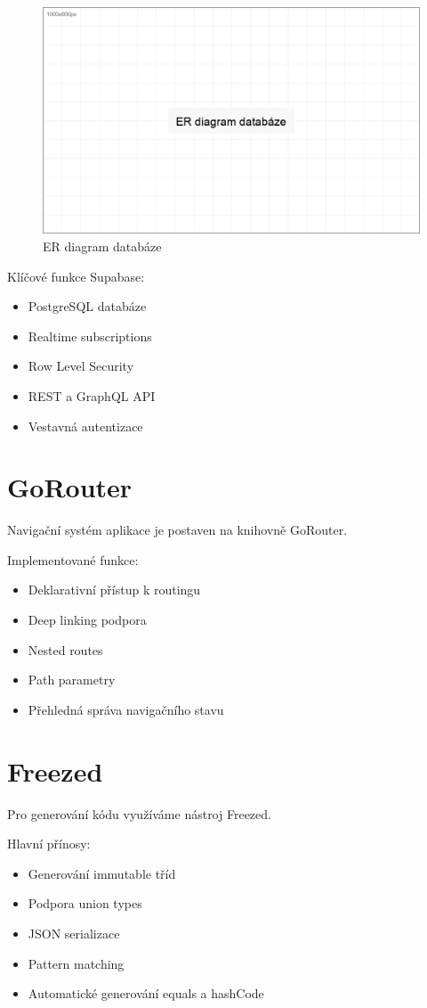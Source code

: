 \documentclass[12pt, a4paper, twoside, openright]{report}
\begin{document}
	\begin{figure}[h]
		\centering
		\includegraphics[width=0.8\linewidth]{image/diagram-databaze.png}
		\caption{ER diagram databáze}
		\label{fig:database}
	\end{figure}

	Klíčové funkce Supabase:
	\begin{itemize}
		\item PostgreSQL databáze
		\item Realtime subscriptions
		\item Row Level Security
		\item REST a GraphQL API
		\item Vestavná autentizace
	\end{itemize}

	\section{GoRouter}
	Navigační systém aplikace je postaven na knihovně GoRouter.

	Implementované funkce:
	\begin{itemize}
		\item Deklarativní přístup k routingu
		\item Deep linking podpora
		\item Nested routes
		\item Path parametry
		\item Přehledná správa navigačního stavu
	\end{itemize}

	\section{Freezed}
	Pro generování kódu využíváme nástroj Freezed.

	Hlavní přínosy:
	\begin{itemize}
		\item Generování immutable tříd
		\item Podpora union types
		\item JSON serializace
		\item Pattern matching
		\item Automatické generování equals a hashCode
	\end{itemize}
\end{document}

